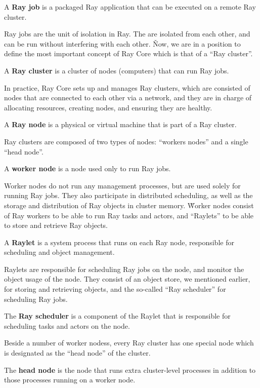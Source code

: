 A \textbf{Ray job} is a packaged Ray application that can be executed on a remote Ray cluster.
\ed

Ray jobs are the unit of isolation in Ray. The are isolated from each other, and can be run without interfering with
each other. \v

Now, we are in a position to define the most important concept of Ray Core which is that of a ``Ray cluster''.

A \textbf{Ray cluster} is a cluster of nodes (computers) that can run Ray jobs.
\ed

In practice, Ray Core sets up and manages Ray clusters, which are consisted of nodes that are connected to each other
via a network, and they are in charge of allocating resources, creating nodes, and ensuring they are healthy.

A \textbf{Ray node} is a physical or virtual machine that is part of a Ray cluster.
\ed

Ray clusters are composed of two types of nodes: ``workers nodes'' and a single ``head node''.

A \textbf{worker node} is a node used only to run Ray jobs.
\ed

Worker nodes do not run any management processes, but are used solely for running Ray jobs. They also participate in
distributed scheduling, as well as the storage and distribution of Ray objects in cluster memory. \v

Worker nodes consist of Ray workers to be able to run Ray tasks and actors, and ``Raylets'' to be able to store and
retrieve Ray objects.

\bd[Raylet]
A \textbf{Raylet} is a system process that runs on each Ray node, responsible for scheduling and object management.
\ed

Raylets are responsible for scheduling Ray jobs on the node, and monitor the object usage of the node. They consist
of an object store, we mentioned earlier, for storing and retrieving objects, and the so-called ``Ray scheduler''
for scheduling Ray jobs.

The \textbf{Ray scheduler} is a component of the Raylet that is responsible for scheduling tasks and actors on the
node.
\ed

Beside a number of worker nodess, every Ray cluster has one special node which is designated as the ``head node'' of
the cluster.

The \textbf{head node} is the node that runs extra cluster-level processes in addition to those processes running on a
worker node.
\ed

